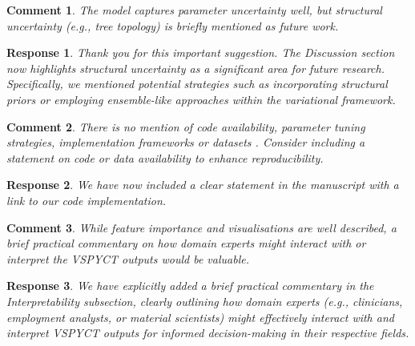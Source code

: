 \documentclass [a4paper,11pt]{article}
\theoremstyle{blue}
\newtheorem{question}{Comment}[section]
\theoremstyle{blue}
\theoremstyle{note}
\newtheorem{answer}{Response}[section]
\theoremstyle{note}
\begin{document}
\begin{question}

The model captures parameter uncertainty well, but structural uncertainty (e.g., tree topology) is briefly mentioned as future work.

\end{question}

\begin{answer}

Thank you for this important suggestion. The Discussion section now highlights structural uncertainty as a significant area for future research. Specifically, we mentioned potential strategies such as incorporating structural priors or employing ensemble-like approaches within the variational framework.

\end{answer}


\begin{question}

There is no mention of code availability, parameter tuning strategies, implementation frameworks or datasets . Consider including a statement on code or data
availability to enhance reproducibility.

\end{question}

\begin{answer}

We have now included a clear statement in the manuscript with a link to our code implementation.

\end{answer}

\begin{question}

While feature importance and visualisations are well described, a brief practical commentary on how domain experts might interact with or interpret the VSPYCT outputs
would be valuable.

\end{question}

\begin{answer}

We have explicitly added a brief practical commentary in the Interpretability subsection, clearly outlining how domain experts (e.g., clinicians, employment analysts, or material scientists) might effectively interact with and interpret VSPYCT outputs for informed decision-making in their respective fields.

\end{answer}
\end{document}

